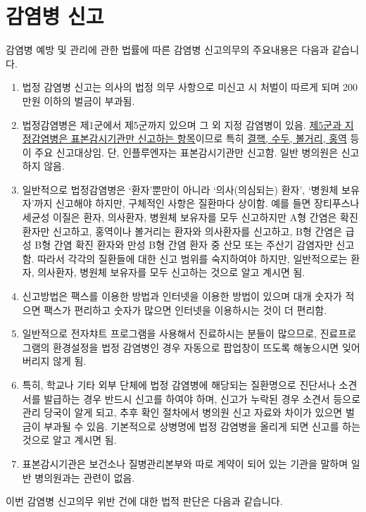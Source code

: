 \section{감염병 신고}
감염병 예방 및 관리에 관한 법률에 따른 감염병 신고의무의 주요내용은 다음과 같습니다.
\begin{enumerate}[1)]\tightlist
\item 법정 감염병 신고는 의사의 법정 의무 사항으로 미신고 시 처벌이 따르게 되며  200만원 이하의 벌금이 부과됨.  
\item 법정감염병은 제1군에서 제5군까지 있으며 그 외 지정 감염병이 있음. \uline{제5군과 지정감염병은 표본감시기관만 신고하는 항목}이므로  특히 \uline{결핵, 수두, 볼거리, 홍역} 등이 주요 신고대상임. 단, 인플루엔자는 표본감시기관만 신고함. 일반 병의원은 신고하지 않음.
\item 일반적으로 법정감염병은 ‘환자’뿐만이 아니라 ‘의사(의심되는) 환자’, ‘병원체 보유자’까지 신고해야 하지만, 구체적인 사항은 질환마다 상이함. 예를 들면 장티푸스나 세균성 이질은 환자, 의사환자, 병원체 보유자를 모두 신고하지만 A형 간염은 확진 환자만 신고하고, 홍역이나 볼거리는 환자와 의사환자를 신고하고, B형 간염은 급성 B형 간염 확진 환자와 만성 B형 간염 환자 중 산모 또는 주산기 감염자만 신고함. 따라서 각각의 질환들에 대한 신고 범위를 숙지하여야 하지만, 일반적으로는 환자, 의사환자, 병원체 보유자를 모두 신고하는 것으로 알고 계시면 됨.
\item 신고방법은 팩스를 이용한 방법과 인터넷을 이용한 방법이 있으며 대개 숫자가 적으면 팩스가 편리하고 숫자가 많으면 인터넷을 이용하시는 것이 더 편리함.
\item 일반적으로 전자챠트 프로그램을 사용해서 진료하시는 분들이 많으므로, 진료프로그램의 환경설정을 법정 감염병인 경우 자동으로 팝업창이 뜨도록 해놓으시면 잊어버리지 않게 됨.
\item 특히, 학교나 기타 외부 단체에 법정 감염병에 해당되는 질환명으로 진단서나 소견서를 발급하는 경우 반드시 신고를 하여야 하며, 신고가 누락된 경우 소견서 등으로 관리 당국이 알게 되고, 추후 확인 절차에서 병의원 신고 자료와 차이가 있으면 벌금이 부과될 수 있음. 기본적으로 상병명에 법정 감염병을 올리게 되면 신고를 하는 것으로 알고 계시면 됨. 
\item 표본감시기관은 보건소나 질병관리본부와 따로 계약이 되어 있는 기관을 말하며 일반 병의원과는 관련이 없음.
\end{enumerate}
이번 감염병 신고의무 위반 건에 대한 법적 판단은 다음과 같습니다.
